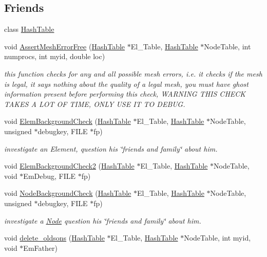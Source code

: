 \subsection*{Friends}
\begin{CompactItemize}
\item 
class \hyperlink{classElement_n0}{Hash\-Table}
\item 
void \hyperlink{classElement_n1}{Assert\-Mesh\-Error\-Free} (\hyperlink{classHashTable}{Hash\-Table} $\ast$El\_\-Table, \hyperlink{classHashTable}{Hash\-Table} $\ast$Node\-Table, int numprocs, int myid, double loc)
\begin{CompactList}\small\item\em this function checks for any and all possible mesh errors, i.e. it checks if the mesh is legal, it says nothing about the quality of a legal mesh, you must have ghost information present before performing this check, WARNING THIS CHECK TAKES A LOT OF TIME, ONLY USE IT TO DEBUG. \item\end{CompactList}\item 
void \hyperlink{classElement_n2}{Elem\-Background\-Check} (\hyperlink{classHashTable}{Hash\-Table} $\ast$El\_\-Table, \hyperlink{classHashTable}{Hash\-Table} $\ast$Node\-Table, unsigned $\ast$debugkey, FILE $\ast$fp)
\begin{CompactList}\small\item\em investigate an Element, question his \char`\"{}friends and family\char`\"{} about him. \item\end{CompactList}\item 
void \hyperlink{classElement_n3}{Elem\-Background\-Check2} (\hyperlink{classHashTable}{Hash\-Table} $\ast$El\_\-Table, \hyperlink{classHashTable}{Hash\-Table} $\ast$Node\-Table, void $\ast$Em\-Debug, FILE $\ast$fp)
\item 
void \hyperlink{classElement_n4}{Node\-Background\-Check} (\hyperlink{classHashTable}{Hash\-Table} $\ast$El\_\-Table, \hyperlink{classHashTable}{Hash\-Table} $\ast$Node\-Table, unsigned $\ast$debugkey, FILE $\ast$fp)
\begin{CompactList}\small\item\em investigate a \hyperlink{classNode}{Node} question his \char`\"{}friends and family\char`\"{} about him. \item\end{CompactList}\item 
void \hyperlink{classElement_n5}{delete\_\-oldsons} (\hyperlink{classHashTable}{Hash\-Table} $\ast$El\_\-Table, \hyperlink{classHashTable}{Hash\-Table} $\ast$Node\-Table, int myid, void $\ast$Em\-Father)

\end{CompactItemize}
